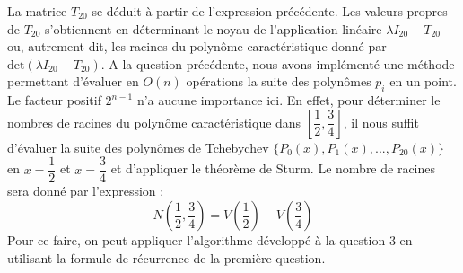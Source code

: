 La matrice $T_{20}$ se déduit à partir de l'expression précédente. Les valeurs propres de $T_{20}$ s'obtiennent en déterminant le noyau de l'application linéaire $\lambda I_{20} - T_{20}$ ou, autrement dit, les racines du polynôme caractéristique donné par $\text{det}(\lambda I_{20} - T_{20})$. A la question précédente, nous avons implémenté une méthode permettant d'évaluer en $O(n)$ opérations la suite des polynômes $p_i$ en un point. %
Le facteur positif $2^{n-1}$ n'a aucune importance ici. En effet, pour déterminer le nombres de racines du polynôme caractéristique dans $\left[ \dfrac{1}{2} , \dfrac{3}{4} \right]$, il nous suffit d'évaluer la suite des polynômes de Tchebychev $ \{ P_0(x), P_1(x), ... , P_{20}(x) \}$ en $x=\dfrac{1}{2}$ et $x=\dfrac{3}{4}$ et d'appliquer le théorème de Sturm. Le nombre de racines sera donné par l'expression :
$$N(\dfrac{1}{2} , \dfrac{3}{4}) = V(\dfrac{1}{2}) - V(\dfrac{3}{4}) $$
Pour ce faire, on peut appliquer l'algorithme développé à la question 3 en utilisant la formule de récurrence de la première question.

